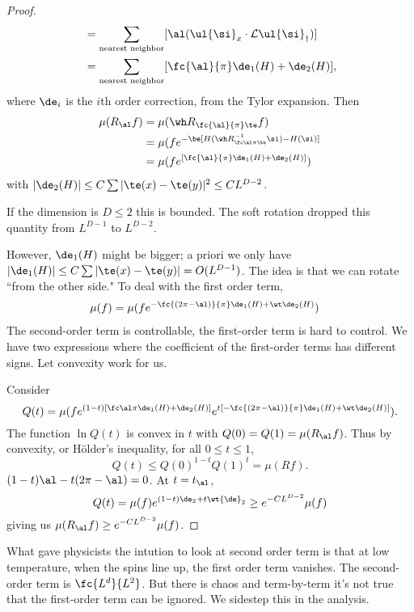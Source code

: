 \begin{proof}
\begin{align}
&= \sum_{\text{nearest neighbor}} [\al(\ul{\si}_x\cdot \cal L \ul{\si}_y)]\\
&=\sum_{\text{nearest neighbor}} [\fc{\al}{\pi} \de_1(H) + \de_2(H)],
\end{align}
where $\de_i$ is the $i$th order correction, from the Tylor expansion. Then 
\begin{align}
\mu(R_\al f) &= \mu(\wh R_{\fc{\al}{\pi}\te}f)\\
&= \mu(f e^{-\be [H(\wh R^{-1}_{\fc\al\pi\te}\si) - H(\si)]}\\
&= \mu(f e^{[\fc{\al}{\pi} \de_1(H) + \de_2(H)]})
\end{align}
with $|\de_2(H)|\le C\sum |\te(x)-\te(y)|^2 \le CL^{D-2}$. 

If the dimension is $D\le 2$ this is bounded. The soft rotation dropped this quantity from $L^{D-1}$ to $L^{D-2}$.

However, $\de_1(H)$ might be bigger; a priori we only have $|\de_1(H)|\le C\sum|\te(x)-\te(y)|=O(L^{D-1})$.
The idea is that we can rotate ``from the other side." To deal with the first order term,
\begin{align}
\mu(f) &= \mu(f e^{-\fc{(2\pi-\al)}{\pi}\de_1(H) + \wt \de_2(H)})
\end{align}
The second-order term is controllable, the first-order term is hard to control. We have two expressions where the coefficient of the first-order terms has different signs. Let convexity work for us.

Consider 
\[
Q(t) = \mu(f e^{(1-t)[\fc\al\pi\de_1(H)+\de_2(H)]} e^{t[-\fc{(2\pi - \al)}{\pi}\de_1(H) + \wt\de_2(H)]}).
\]
The function $\ln Q(t)$ is convex in $t$ with $Q(0)=Q(1) = \mu(R_\al f)$. Thus by convexity, or H\"older's inequality,
for all $0\le t\le 1$, 
\[
Q(t) \le Q(0)^{1-t}Q(1)^{t} = \mu(Rf).
\]
$(1-t)\al - t(2\pi - \al) = 0$. At $t=t_\al$,
\[
Q(t) = \mu(f) e^{(1-t) \de_2+ t\wt{\de}_2} \ge e^{-CL^{D-2}} \mu(f)
\]
giving us $\mu(R_\al f) \ge e^{-CL^{D-2}}\mu(f)$.

\end{proof}
What gave physicists the intution to look at second order term is that at low temperature, when the spins line up, the first order term vanishes. The second-order term is $\fc{L^d}{L^2}$. But there is chaos and term-by-term it's not true that the first-order term can be ignored. We sidestep this in the analysis.

